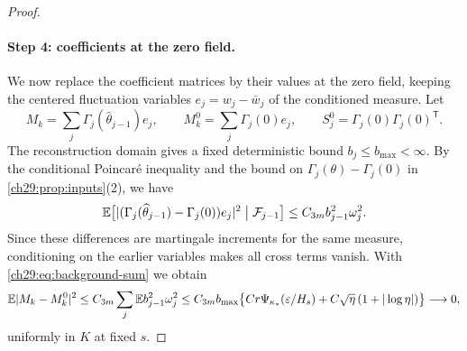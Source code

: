 \begin{proof}
\paragraph{Step 4: coefficients at the zero field.}
We now replace the coefficient matrices by their values at the zero field, keeping the centered fluctuation variables $e_j=w_j-\bar w_j$ of the conditioned measure. Let
\[
 M_k=\sum_j\Gamma_j(\widehat\theta_{j-1})e_j,\qquad M_k^0=\sum_j\Gamma_j(0)e_j,\qquad S_j^0=\Gamma_j(0)\Gamma_j(0)^{\mathsf T}.
\]
The reconstruction domain gives a fixed deterministic bound $b_j\le b_{\max}<\infty$. By the conditional Poincaré inequality and the bound on $\Gamma_j(\theta)-\Gamma_j(0)$ in \cref{ch29:prop:inputs}(2), we have
\[
 \mathbb E\bigl[|(\Gamma_j(\widehat\theta_{j-1})-\Gamma_j(0))e_j|^2\bigm|\mathcal F_{j-1}\bigr]\le C_{3m}b_{j-1}^2\omega_j^2.
\]
Since these differences are martingale increments for the same measure, conditioning on the earlier variables makes all cross terms vanish. With \eqref{ch29:eq:background-sum} we obtain
\begin{equation}\label{ch29:eq:flat-row-error}
 \mathbb E|M_k-M_k^0|^2\le C_{3m}\sum_j\mathbb E b_{j-1}^2\omega_j^2\le C_{3m}b_{\max}\bigl\{Cr\Psi_{\kappa_*}(\varepsilon/H_s)+C\sqrt\eta\,(1+|\log\eta|)\bigr\}\longrightarrow0,
\end{equation}
uniformly in $K$ at fixed $s$.


\end{proof}

